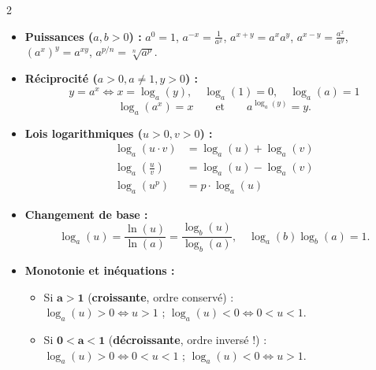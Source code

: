 {\begin{multicols}{2}
\vspace{3pt}
\begin{itemize}[leftmargin=1.2em, itemsep=1.5pt, topsep=2pt]
    \item \textbf{Puissances ($a,b > 0$) :} $a^0 = 1$, $a^{-x} = \frac{1}{a^x}$, $a^{x+y} = a^x a^y$, $a^{x-y} = \frac{a^x}{a^y}$, $(a^x)^y = a^{xy}$, $a^{p/n} = \sqrt[n]{a^p}$.
    \item \textbf{Réciprocité ($a > 0, a \neq 1, y > 0$) :}
    \[
        y = a^x \iff x = \log_a(y), \quad \log_a(1) = 0, \quad \log_a(a) = 1
    \]
    \[
        \log_a(a^x) = x \qquad \text{et} \qquad a^{\log_a(y)} = y.
    \]
    \item \textbf{Lois logarithmiques ($u > 0, v > 0$) :}
    \begin{align*}
        \log_a(u \cdot v) &= \log_a(u) + \log_a(v) \\
        \log_a\left(\frac{u}{v}\right) &= \log_a(u) - \log_a(v) \\
        \log_a(u^p) &= p\cdot\log_a(u)
    \end{align*}
    \item \textbf{Changement de base :}
    \[
        \boxed{\log_a(u) = \frac{\ln(u)}{\ln(a)} = \frac{\log_b(u)}{\log_b(a)}}, \quad \log_a(b)\log_b(a) = 1.
    \]
    \item \textbf{Monotonie et inéquations :}
    \begin{itemize}[leftmargin=1em, itemsep=1pt]
        \item Si $\mathbf{a > 1}$ (\textbf{croissante}, ordre conservé) :\\
        $\log_a(u) > 0 \iff u > 1$ ; \; $\log_a(u) < 0 \iff 0 < u < 1$.
        \item Si $\mathbf{0 < a < 1}$ (\textbf{décroissante}, ordre inversé !) :\\
        $\log_a(u) > 0 \iff 0 < u < 1$ ; \; $\log_a(u) < 0 \iff u > 1$.
    \end{itemize}
\end{itemize}

\end{multicols}
}

\newpage
\thispagestyle{plain}

